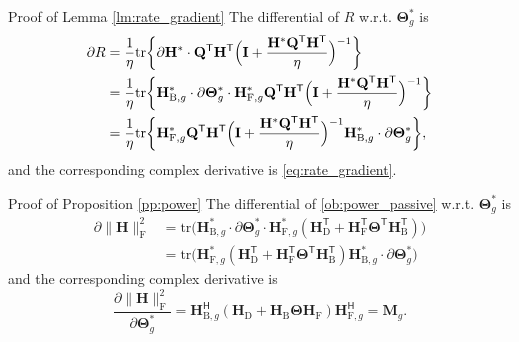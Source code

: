 \documentclass[journal]{IEEEtran}
\begin{document}
\begin{appendix}
	\begin{subsection}{Proof of Lemma \ref{lm:rate_gradient}}\label{ap:rate_gradient}
		The differential of $R$ w.r.t. $\mathbf{\Theta}_g^*$ is \cite{Hjorungnes2007}
		\begin{align*}
			\partial R
			& = \frac{1}{\eta} \mathrm{tr} \biggl\{ \partial \mathbf{H}^* \cdot \mathbf{Q}^\mathsf{T} \mathbf{H}^\mathsf{T} \Bigl(\mathbf{I} + \frac{\mathbf{H}^* \mathbf{Q}^\mathsf{T} \mathbf{H}^\mathsf{T}}{\eta}\Bigr)^{-1} \biggr\}\\
			& = \frac{1}{\eta} \mathrm{tr} \biggl\{ \mathbf{H}_{\mathrm{B},g}^* \cdot \partial \mathbf{\Theta}_g^* \cdot \mathbf{H}_{\mathrm{F},g}^* \mathbf{Q}^\mathsf{T} \mathbf{H}^\mathsf{T} \Bigl(\mathbf{I} + \frac{\mathbf{H}^* \mathbf{Q}^\mathsf{T} \mathbf{H}^\mathsf{T}}{\eta}\Bigr)^{-1} \biggr\}\\
			& = \frac{1}{\eta} \mathrm{tr} \biggl\{ \mathbf{H}_{\mathrm{F},g}^* \mathbf{Q}^\mathsf{T} \mathbf{H}^\mathsf{T} \Bigl(\mathbf{I} + \frac{\mathbf{H}^* \mathbf{Q}^\mathsf{T} \mathbf{H}^\mathsf{T}}{\eta}\Bigr)^{-1} \mathbf{H}_{\mathrm{B},g}^* \cdot \partial \mathbf{\Theta}_g^* \biggr\},
		\end{align*}
		and the corresponding complex derivative is \eqref{eq:rate_gradient}.
	\end{subsection}

	\begin{subsection}{Proof of Proposition \ref{pp:power}}\label{ap:power}
		The differential of \eqref{ob:power_passive} w.r.t. $\mathbf{\Theta}_g^*$ is
		\begin{align*}
			\partial \lVert \mathbf{H} \rVert _\mathrm{F}^2
			& = \mathrm{tr}\bigl(\mathbf{H}_{\mathrm{B},g}^* \cdot \partial \mathbf{\Theta}_g^* \cdot \mathbf{H}_{\mathrm{F},g}^* (\mathbf{H}_\mathrm{D}^\mathsf{T} + \mathbf{H}_\mathrm{F}^\mathsf{T} \mathbf{\Theta}^\mathsf{T} \mathbf{H}_\mathrm{B}^\mathsf{T})\bigr)\\
			& = \mathrm{tr}\bigl(\mathbf{H}_{\mathrm{F},g}^* (\mathbf{H}_\mathrm{D}^\mathsf{T} + \mathbf{H}_\mathrm{F}^\mathsf{T} \mathbf{\Theta}^\mathsf{T} \mathbf{H}_\mathrm{B}^\mathsf{T}) \mathbf{H}_{\mathrm{B},g}^* \cdot \partial \mathbf{\Theta}_g^*\bigr)
		\end{align*}
		and the corresponding complex derivative is
		\begin{equation}
			\frac{\partial \lVert \mathbf{H} \rVert _\mathrm{F}^2}{\partial \mathbf{\Theta}_g^*} = \mathbf{H}_{\mathrm{B},g}^\mathsf{H} (\mathbf{H}_\mathrm{D} + \mathbf{H}_\mathrm{B} \mathbf{\Theta} \mathbf{H}_\mathrm{F}) \mathbf{H}_{\mathrm{F},g}^\mathsf{H} = \mathbf{M}_g.
		\end{equation}


\end{subsection}
\end{appendix}
\end{document}
